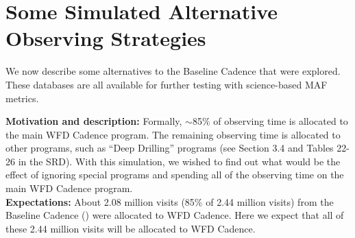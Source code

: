 \navigationbar









\section{Some Simulated Alternative Observing Strategies}
\def\secname{cadexp:alternatives}\label{sec:\secname}

We now describe some alternatives to the Baseline Cadence that were
explored. These \OpSim databases are all available for further testing
with science-based MAF metrics.



{\bf Motivation and description:} Formally, $\sim$85\% of observing
time is allocated to the main WFD Cadence program. The
remaining observing time is allocated to other programs, such as
``Deep Drilling'' programs (see Section 3.4 and Tables 22-26  in the
SRD). With this simulation, we wished to find out what would be the
effect of ignoring special programs and spending all of the observing
time on the main WFD Cadence program. \\

{\bf Expectations:} About 2.08 million visits (85\% of 2.44 million
visits) from the Baseline Cadence () were allocated
to WFD Cadence. Here we expect that all of these 2.44 million visits
will be allocated to WFD Cadence. \\

